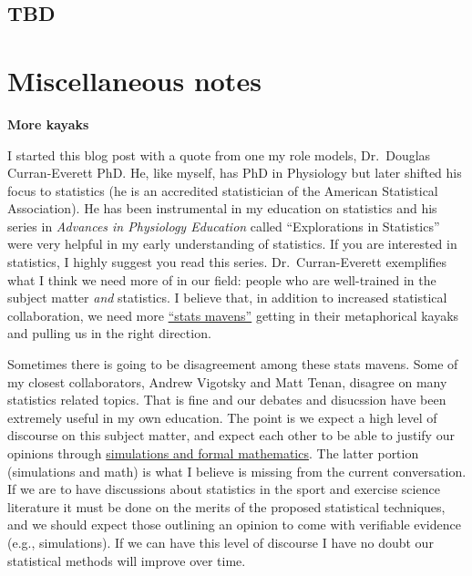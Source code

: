 \documentclass[
]{article}
\begin{document}
\hypertarget{tbd}{%
\subsection{TBD}\label{tbd}}

\hypertarget{miscellaneous-notes}{%
\section{Miscellaneous notes}\label{miscellaneous-notes}}

\textbf{More kayaks}

I started this blog post with a quote from one my role models,
Dr.~Douglas Curran-Everett PhD. He, like myself, has PhD in Physiology
but later shifted his focus to statistics (he is an accredited
statistician of the American Statistical Association). He has been
instrumental in my education on statistics and his series in
\emph{Advances in Physiology Education} called ``Explorations in
Statistics'' were very helpful in my early understanding of statistics.
If you are interested in statistics, I highly suggest you read this
series. Dr.~Curran-Everett exemplifies what I think we need more of in
our field: people who are well-trained in the subject matter \emph{and}
statistics. I believe that, in addition to increased statistical
collaboration, we need more
\href{https://thehardestscience.com/2015/02/16/top-10-signs-you-are-a-statistics-maven/}{``stats
mavens''} getting in their metaphorical kayaks and pulling us in the
right direction.

Sometimes there is going to be disagreement among these stats mavens.
Some of my closest collaborators, Andrew Vigotsky and Matt Tenan,
disagree on many statistics related topics. That is fine and our debates
and disucssion have been extremely useful in my own education. The point
is we expect a high level of discourse on this subject matter, and
expect each other to be able to justify our opinions through
\href{https://osf.io/preprints/sportrxiv/8ndhg/}{simulations and formal
mathematics}. The latter portion (simulations and math) is what I
believe is missing from the current conversation. If we are to have
discussions about statistics in the sport and exercise science
literature it must be done on the merits of the proposed statistical
techniques, and we should expect those outlining an opinion to come with
verifiable evidence (e.g., simulations). If we can have this level of
discourse I have no doubt our statistical methods will improve over
time.
\end{document}
